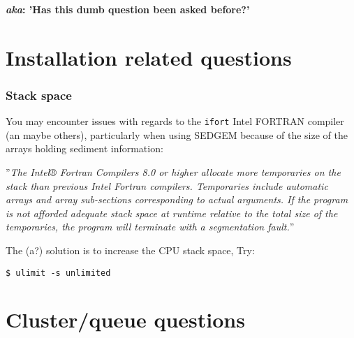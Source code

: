 \documentclass[11pt,fleqn]{book} %
\begin{document}
\hfill \break
\vspace{24mm}

\noindent \huge \textbf{\textit{aka}: 'Has this dumb question been asked before?'}\normalsize


\newpage


\section{Installation related questions}

%

\subsubsection{Stack space}

You may encounter issues with regards to the \texttt{ifort} Intel FORTRAN compiler (an maybe others), particularly when using SEDGEM because of the size of the arrays holding sediment information:

\vspace{2mm}
\noindent ''\textit{The Intel® Fortran Compilers 8.0 or higher allocate more temporaries on the stack than previous Intel Fortran compilers.
Temporaries include automatic arrays and array sub-sections corresponding to actual arguments. If the program is not afforded adequate stack space at runtime relative to the total size of the temporaries,
the program will terminate with a segmentation fault.}''

\vspace{2mm}
\noindent The (a?) solution is to increase the CPU stack space, Try:
\vspace{-2pt}\begin{verbatim}$ ulimit -s unlimited\end{verbatim}\vspace{-2pt}


\newpage


\section{Cluster/queue questions}
\end{document}
